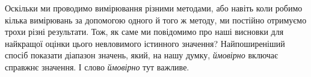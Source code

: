 \documentclass{LabBook}
\begin{document}
%

Оскільки ми проводимо вимірювання різними методами, або навіть коли робимо кілька вимірювань за допомогою одного й того ж методу, ми постійно отримуємо трохи різні результати. Тож, як саме ми повідомимо про наші висновки для найкращої оцінки цього невловимого істинного значення? Найпоширеніший спосіб показати діапазон значень, який, на нашу думку, \emph{ймовірно} включає справжнє значення. І слово \emph{ймовірно} тут важливе.
\end{document}
